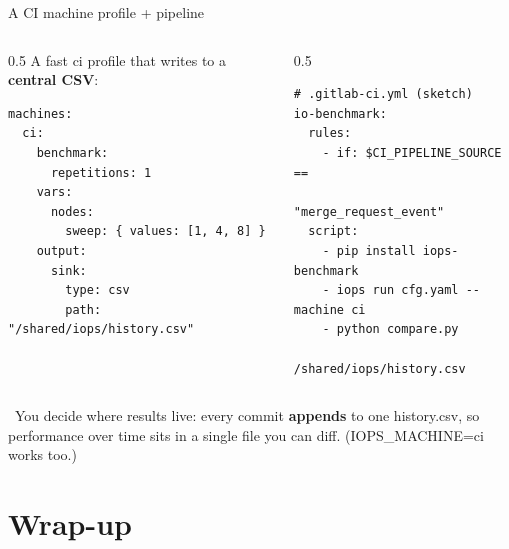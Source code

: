 \documentclass[aspectratio=169,11pt]{beamer}
\newcommand{\code}[1]{{\ttfamily\small\color{iopsNavy}#1}}
\newcommand{\hl}[1]{{\color{iopsPink}\bfseries #1}}
\begin{document}
\begin{frame}[fragile]{A CI machine profile + pipeline}
  \begin{columns}[T]
    \begin{column}{0.5\textwidth}
      A fast \code{ci} profile that writes to a \hl{central CSV}:
\begin{lstlisting}[style=yaml]
machines:
  ci:
    benchmark:
      repetitions: 1
    vars:
      nodes:
        sweep: { values: [1, 4, 8] }
    output:
      sink:
        type: csv
        path: "/shared/iops/history.csv"
\end{lstlisting}
    \end{column}
    \begin{column}{0.5\textwidth}
\begin{lstlisting}[style=sh]
# .gitlab-ci.yml (sketch)
io-benchmark:
  rules:
    - if: $CI_PIPELINE_SOURCE ==
          "merge_request_event"
  script:
    - pip install iops-benchmark
    - iops run cfg.yaml --machine ci
    - python compare.py
        /shared/iops/history.csv
\end{lstlisting}
    \end{column}
  \end{columns}
  \begin{keybox}
    \faRocket~You decide where results live: every commit \hl{appends} to one
    \code{history.csv}, so performance over time sits in a single file you can
    diff. (\code{IOPS\_MACHINE=ci} works too.)
  \end{keybox}
\end{frame}

\section{Wrap-up}
\end{document}
